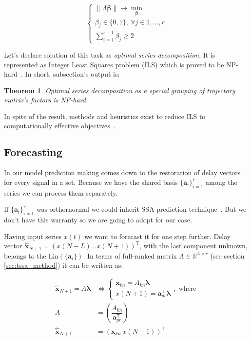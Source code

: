 \documentclass[referee, pdflatex]{sn-jnl}
\theoremstyle{definition}
\theoremstyle{plain}
\newtheorem{Th}{Theorem}
\newcommand{\delayV}[1]{\overset{\leftarrow}{\mathbf{x}}_{#1}}
\begin{document}
	\begin{equation}\label{eq:decomp_search_final}
		\begin{cases*}
			\lVert \Lambda \boldsymbol{\beta} \rVert \to \underset{\boldsymbol{\beta}}{\min} \\
			\beta_j \in \{0, 1\}, \ \forall j \in 1, \ldots, r \\
			\sum\limits_{i = 1}^{r - 1} \beta_j \ge 2
		\end{cases*}
	\end{equation}
	
	Let's declare solution of this task as \emph{optimal series decomposition}. It is represented as Integer Least Squares problem (ILS) which is proved to be NP-hard~\cite{van1981another}. In short, subsection's output is:
	
	\begin{Th}
		Optimal series decomposition as a special grouping of trajectory matrix's factors is NP-hard.
	\end{Th}
	
	In spite of the result, methods and heuristics exist to reduce ILS to computationally effective objectives~\cite{Grafarend2022}.
	
	\subsection{Forecasting}\label{sec:tssa_forecast}
	
	In our model prediction making comes down to the restoration of delay vectors for every signal in a set. Because we have the shared basis $ \{\mathbf{a}_i\}_{i = 1}^r $ among the series we can process them separately. 
	
	If $ \{\mathbf{a}_i\}_{i = 1}^r $ was orthornormal we could inherit SSA prediction technique~\cite{ecfb9dc578be43ae9ee8fc88b8ff9151}. But we don't have this warranty so we are going to adopt for our case.
	
	Having input series $ x(t) $ we want to forecast it for one step further. Delay vector $ \delayV{N + 1} = (x(N - L) \ldots x(N + 1))^{\mathsf{T}} $, with the last component unknown, belongs to the $ \text{Lin}(\{\mathbf{a}_i\}) $. In terms of full-ranked matrix $ A \in \mathbb{R}^{L \times r} $ (see section \ref{sec:tssa_method}) it can be written as:
	
	\begin{align}\label{eq:main_pred_for_A}
		\delayV{N + 1} = A \boldsymbol{\lambda} &\Leftrightarrow \begin{cases}
			\mathbf{x}_{kn} = A_{kn} \boldsymbol{\lambda}  \\
			x(N + 1) = \mathbf{a}_{pr}^{\mathsf{T}} \boldsymbol{\lambda}
		\end{cases}, \text{ where } \\
		A &= \left( \dfrac{A_{kn}}{\mathbf{a}_{pr}^{\mathsf{T}}} \right) \nonumber \\
		\delayV{N + 1} &= (\mathbf{x}_{kn} \  x(N + 1))^{\mathsf{T}} \nonumber
	\end{align}
	
\end{document}
